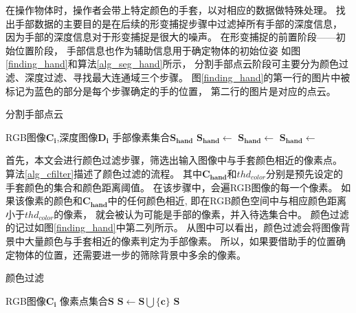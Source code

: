 在操作物体时，操作者会带上特定颜色的手套，以对相应的数据做特殊处理。
找出手部数据的主要目的是在后续的形变捕捉步骤中过滤掉所有手部的深度信息，
因为手部的深度信息对于形变捕捉是很大的噪声。
在形变捕捉的前置阶段——初始位置阶段，
手部信息也作为辅助信息用于确定物体的初始位姿
如图\ref{finding_hand}和算法\ref{alg_seg_hand}所示，
分割手部点云阶段可主要分为颜色过滤、深度过滤、寻找最大连通域三个步骤。
图\ref{finding_hand}的第一行的图片中被标记为蓝色的部分是每个步骤确定的手的位置，
第二行的图片是对应的点云。
\begin{algorithm}
    \fangsong
    \caption{分割手部点云}
    \label{alg_seg_hand}
    \begin{algorithmic}[1]
        \Require RGB图像$\mathbf{C_i}$,深度图像$\mathbf{D_i}$
        \Ensure 手部像素集合$\mathbf{S_{hand}}$
            \State $\mathbf{S_{hand}} \gets$ 
            \State $\mathbf{S_{hand}} \gets$ 
            \State $\mathbf{S_{hand}} \gets$ 
        \EndProcedure
    \end{algorithmic}
\end{algorithm}

首先，本文会进行颜色过滤步骤，筛选出输入图像中与手套颜色相近的像素点。
算法\ref{alg_cfilter}描述了颜色过滤的流程。
其中$\mathbf{C_{hand}}$和$thd_{color}$分别是预先设定的手套颜色的集合和颜色距离阈值。
在该步骤中，会遍RGB图像的每一个像素。
如果该像素的颜色和$\mathbf{C_{hand}}$中的任何颜色相近,
即在RGB颜色空间中与相应颜色距离小于$thd_{color}$的像素，
就会被认为可能是手部的像素，并入待选集合中。
颜色过滤的记过如图\ref{finding_hand}中第二列所示。
从图中可以看出，颜色过滤会将图像背景中大量颜色与手套相近的像素判定为手部像素。
所以，如果要借助手的位置确定物体的位置，还需要进一步的筛除背景中多余的像素。
\begin{algorithm}
    \fangsong
    \caption{颜色过滤}
    \label{alg_cfilter}
    \begin{algorithmic}[1]
        \Require RGB图像$\mathbf{C_i}$
        \Ensure 像素点集合$\mathbf{S}$
                    \State $\mathbf{S} \gets \mathbf{S} \bigcup \{\mathbf{c}\}$
                    \EndIf
                \EndFor
            \EndFor 
            \State \Return $\mathbf{S}$
        \EndFunction
    \end{algorithmic}
\end{algorithm}

